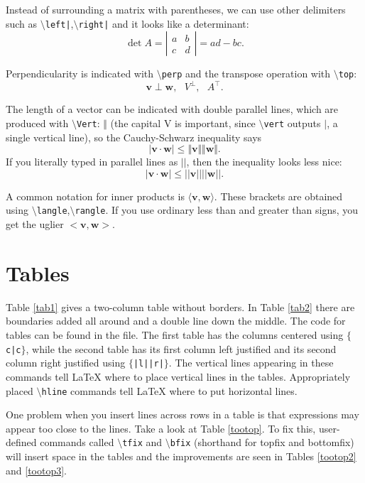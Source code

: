 \documentclass[12pt,letterpaper]{amsart}
\newcommand{\latex}{\LaTeX}
\newcommand{\sm}{\setminus}
\newcommand{\pln}[1]{$\sm${\tt #1}}
\theoremstyle{plain}
\theoremstyle{definition}
\numberwithin{equation}{section}
\begin{document}
Instead of surrounding a matrix with parentheses, we can 
use other delimiters such as 
\pln{left|},\pln{right|} and it looks like a determinant: 
$$
\det A = 
\left|
\begin{array}{cc}
a & b \\
c & d 
\end{array}
\right| = ad - bc.
$$

Perpendicularity is indicated with \pln{perp} and the transpose 
operation with \pln{top}:
$$
{\mathbf v} \perp {\mathbf w}, \ \ \ V^\perp, \ \ \ A^\top.
$$

The length of a vector can be indicated with double parallel lines, which 
are produced with
\pln{Vert}: 
$\Vert$ (the capital V is important, since 
\pln{vert} 
outputs $\vert$, a single 
vertical line), 
so the Cauchy-Schwarz inequality says 
$$
|{\mathbf v}\cdot{\mathbf w}| \leq \Vert{\mathbf v}\Vert\Vert{\mathbf w}\Vert.
$$
If you literally typed in parallel lines as $||$, then the 
inequality looks less nice:
$$
|{\mathbf v}\cdot{\mathbf w}| \leq ||{\mathbf v}||||{\mathbf w}||.
$$


A common notation for inner products is 
$\langle {\mathbf v},{\mathbf w}\rangle$.  These 
brackets are obtained using \pln{langle},\pln{rangle}. 
If you use ordinary less than and greater than signs, you 
get the uglier $<{\mathbf v},{\mathbf w}>$.


\section{Tables}

Table \ref{tab1} gives a two-column table without borders. 
In Table \ref{tab2} there are boundaries added all around 
and a double line down the middle. 
The code for tables can be found in the file.  
The first table has the columns centered using 
{\tt $\{$c|c$\}$}, while the second table 
has its first column left justified and 
its second column right justified using 
{\tt $\{$|l||r|$\}$}.  The vertical lines 
appearing in these commands tell \latex{} 
where to place vertical lines in the tables. 
Appropriately placed \pln{hline} commands 
tell \latex{} where to put horizontal lines. 

One problem when you insert lines across rows in a table is that 
expressions may appear too close to the lines.  Take a look at 
Table \ref{tootop}.  To fix this, user-defined commands called 
\pln{tfix} and \pln{bfix} (shorthand for topfix and bottomfix) will insert 
space in the tables and the improvements are seen in 
Tables \ref{tootop2} and \ref{tootop3}. 
\end{document}
